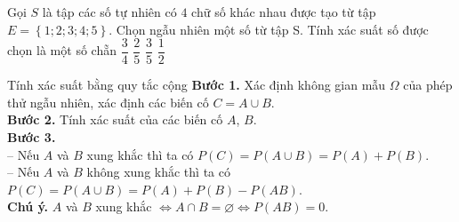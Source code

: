 \begin{bt}
	Gọi $S$ là tập các số tự nhiên có $4$ chữ số khác nhau được tạo từ tập $E = \left\lbrace 1; 2; 3; 4; 5\right\rbrace $. Chọn ngẫu nhiên một số từ tập S. Tính xác suất số được chọn là một số chẵn
	\choice
	{$ \dfrac{3}{4} $}
	{\True$ \dfrac{2}{5} $}
	{$ \dfrac{3}{5} $}
	{$ \dfrac{1}{2} $}
\end{bt}

\begin{dang}{Tính xác suất bằng quy tắc cộng}
	\textbf{Bước 1.} Xác định không gian mẫu $\Omega$ của phép thử ngẫu nhiên, xác định các biến cố $C=A\cup B$.\\
	\textbf{Bước 2.} Tính xác suất của các biến cố $A$, $B$.\\
	\textbf{Bước 3.} \\
	-- Nếu $A$ và $B$ xung khắc thì ta có $P(C)=P(A\cup B)=P(A)+P(B)$.\\
	-- Nếu $A$ và $B$ không xung khắc thì ta có $P(C)=P(A\cup B)=P(A)+P(B)-P(AB)$.\\
	\textbf{Chú ý.} $A$ và $B$ xung khắc $\iff A\cap B = \varnothing \iff P(AB)= 0$. 
\end{dang}


